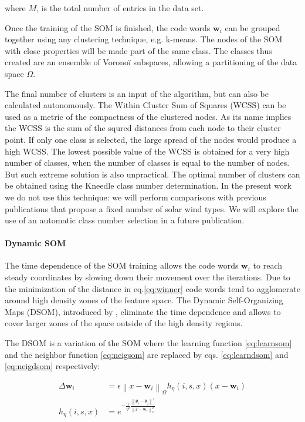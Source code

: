 where $M$, is the total number of entries in the data set.

Once the training of the SOM is finished, the code words $\boldsymbol{w}_i$ can be grouped together using any clustering technique, e.g. k-means. The nodes of the SOM with close properties will be made part of the same class. The classes thus created are an ensemble of Vorono\"i subspaces, allowing a partitioning of the data space $\Omega$.

The final number of clusters is an input of the algorithm, but can also be calculated autonomously. The Within Cluster Sum of Squares (WCSS) can be used as a metric of the compactness of the clustered nodes. As its name implies the WCSS is the sum of the squred distances from each node to their cluster point. If only one class is selected, the large spread of the nodes would produce a high WCSS. The lowest possible value of the WCSS is obtained for a very high number of classes, when the number of classes is equal to the number of nodes. But such extreme solution is also unpractical. The optimal number of clusters can be obtained using the Kneedle class number determination\citep{5961514}. In the present work we do not use this technique: we will perform comparisons with previous publications that propose a fixed number of solar wind types. We will explore the use of an automatic class number selection in a future publication.

\paragraph{Dynamic SOM}
The time dependence of the SOM training allows the code words $\boldsymbol{w}_i$ to reach steady coordinates by slowing down their movement over the iterations. Due to the minimization of the distance in eq.\eqref{eq:winner} code words tend to agglomerate around high density zones of the feature space. The Dynamic Self-Organizing Maps (DSOM), introduced by \citep{Rougier2011}, eliminate the time dependence and allows to cover larger zones of the space outside of the high density regions.

The DSOM is a variation of the SOM where the learning function \eqref{eq:learnsom} and the neighbor function \eqref{eq:neigsom} are replaced by eqs. \eqref{eq:learndsom} and \eqref{eq:neigdsom} respectively:

\begin{align}
\Delta \boldsymbol{w}_i & = \epsilon \left\lVert x - \boldsymbol{w}_i \right\rVert_\Omega h_\eta(i,s,x)(x-\boldsymbol{w}_i) \label{eq:learndsom} \\
h_\eta(i,s,x) & = e^{-\frac{1}{\eta^2}\frac{\left\lVert \boldsymbol{p}_i - \boldsymbol{p}_j \right\rVert^2}{\left\lVert x - \boldsymbol{w}_s \right\rVert_\Omega^2}} \label{eq:neigdsom} 
\end{align}

